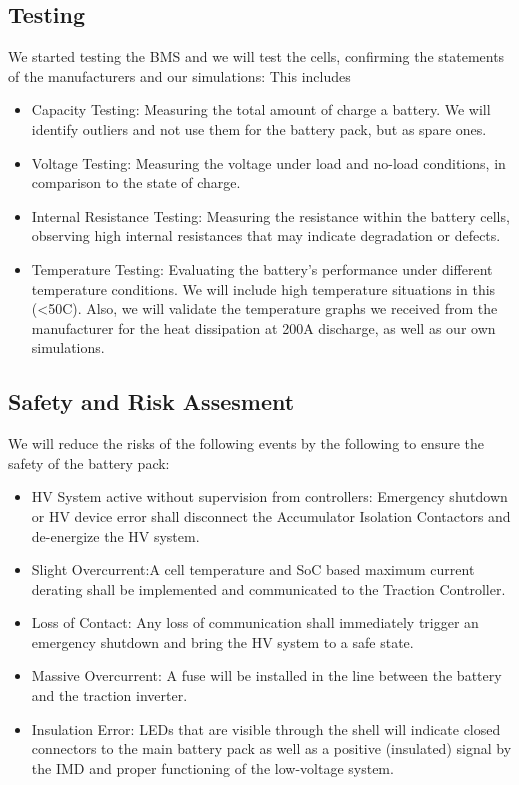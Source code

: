 \subsection{Testing}
We started testing the BMS and we will test the cells, confirming the statements of the manufacturers and our simulations: This includes 
\begin{itemize}
    \item Capacity Testing: Measuring the total amount of charge a battery. We will identify outliers and not use them for the battery pack, but as spare ones.
    \item Voltage Testing: Measuring the voltage under load and no-load conditions, in comparison to the state of charge.
    \item Internal Resistance Testing: 
    Measuring the resistance within the battery cells, observing high internal resistances that may indicate degradation or defects.
    \item Temperature Testing: Evaluating the battery's performance under different temperature conditions. We will include high temperature situations in this (<50C). Also, we will validate the temperature graphs we received from the manufacturer for the heat dissipation at 200A discharge, as well as our own simulations.
\end{itemize}
\subsection{Safety and Risk Assesment}
We will reduce the risks of the following events by the following to ensure the safety of the battery pack:
\begin{itemize}
    \item HV System active without supervision from controllers: Emergency shutdown or HV device error shall disconnect the Accumulator Isolation Contactors and de-energize the HV system.
    \item Slight Overcurrent:A cell temperature and SoC based maximum current derating shall be implemented and communicated to the Traction Controller.
    \item Loss of Contact: Any loss of communication shall immediately trigger an emergency shutdown and bring the HV system to a safe state.
    \item Massive Overcurrent: A fuse will be installed in the line between the battery and the traction inverter.
    \item Insulation Error: LEDs that are visible through the shell will indicate closed connectors to the main battery pack as well as a positive (insulated) signal by the IMD and proper functioning of the low-voltage system.
\end{itemize}

